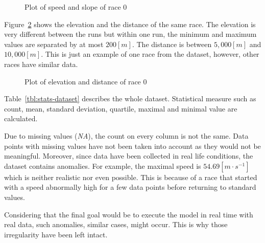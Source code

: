\documentclass[a4paper, 10pt, conference]{ieeeconf}      %
\begin{document}
\begin{figure}[thpb]
  \center
  \centering
  \caption{Plot of speed and slope of race 0}
  \label{fig:speed-slope}
\end{figure}

Figure~\ref{fig:elevation-distance} shows the elevation and the distance of the same race. The elevation is very different between the runs but within one run, the minimum and maximum values are separated by at most $200 [m]$. The distance is between $5,000 [m]$ and $10,000 [m]$. This is just an example of one race from the dataset, however, other races have similar data.

\begin{figure}[thpb]
  \center
  \centering
  \caption{Plot of elevation and distance of race 0}
  \label{fig:elevation-distance}
\end{figure}

Table~\ref{tbl:stats-dataset} describes the whole dataset. Statistical measure such as count, mean, standard deviation, quartile, maximal and minimal value are calculated.

Due to missing values (\textit{NA}), the count on every column is not the same. Data points with missing values have not been taken into account as they would not be meaningful. Moreover, since data have been collected in real life conditions, the dataset contains anomalies. For example, the maximal speed is $54.69[m \cdot s^{-1}]$ which is neither realistic nor even possible. This is because of a race that started with a speed abnormally high for a few data points before returning to standard values.

Considering that the final goal would be to execute the model in real time with real data, such anomalies, similar cases, might occur. This is why those irregularity have been left intact.
\end{document}
